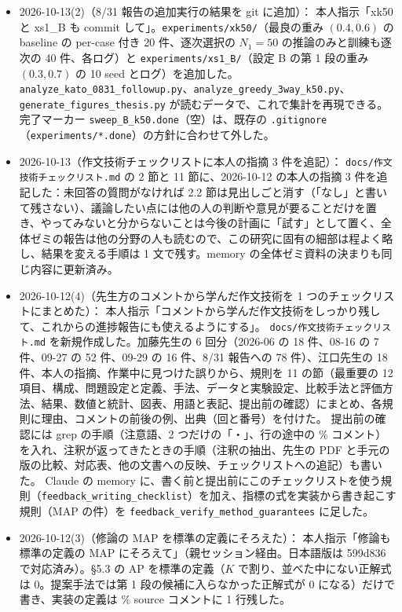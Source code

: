 \documentclass[11pt,a4paper]{jsarticle}
\begin{document}
\begin{itemize}[nosep]
  \item 2026-10-13(2)（8/31 報告の追加実行の結果を git に追加）：
    本人指示「xk50 と xs1\_B も commit して」。\texttt{experiments/xk50/}（最良の重み $(0.4, 0.6)$ の baseline の per-case 付き 20 件、逐次選択の $N_1 = 50$ の推論のみと訓練も逐次の 40 件、各ログ）と \texttt{experiments/xs1\_B/}（設定 B の第 1 段の重み $(0.3, 0.7)$ の 10 seed とログ）を追加した。\texttt{analyze\_kato\_0831\_followup.py}、\texttt{analyze\_greedy\_3way\_k50.py}、\texttt{generate\_figures\_thesis.py} が読むデータで、これで集計を再現できる。完了マーカー \texttt{sweep\_B\_k50.done}（空）は、既存の \texttt{.gitignore}（\texttt{experiments/*.done}）の方針に合わせて外した。
  \item 2026-10-13（作文技術チェックリストに本人の指摘 3 件を追記）：
    \texttt{docs/作文技術チェックリスト.md} の 2 節と 11 節に、2026-10-12 の本人の指摘 3 件を追記した：未回答の質問がなければ 2.2 節は見出しごと消す（「なし」と書いて残さない）、議論したい点には他の人の判断や意見が要ることだけを置き、やってみないと分からないことは今後の計画に「試す」として置く、全体ゼミの報告は他の分野の人も読むので、この研究に固有の細部は程よく略し、結果を変える手順は 1 文で残す。memory の全体ゼミ資料の決まりも同じ内容に更新済み。
  \item 2026-10-12(4)（先生方のコメントから学んだ作文技術を 1 つのチェックリストにまとめた）：
    本人指示「コメントから学んだ作文技術をしっかり残して、これからの進捗報告にも使えるようにする」。
    \texttt{docs/作文技術チェックリスト.md} を新規作成した。加藤先生の 6 回分（2026-06 の 18 件、08-16 の 7 件、09-27 の 52 件、09-29 の 16 件、8/31 報告への 78 件）、江口先生の 18 件、本人の指摘、作業中に見つけた誤りから、規則を 11 の節（最重要の 12 項目、構成、問題設定と定義、手法、データと実験設定、比較手法と評価方法、結果、数値と統計、図表、用語と表記、提出前の確認）にまとめ、各規則に理由、コメントの前後の例、出典（回と番号）を付けた。
    提出前の確認には grep の手順（注意語、2 つだけの「・」、行の途中の \% コメント）を入れ、注釈が返ってきたときの手順（注釈の抽出、先生の PDF と手元の版の比較、対応表、他の文書への反映、チェックリストへの追記）も書いた。
    Claude の memory に、書く前と提出前にこのチェックリストを使う規則（\texttt{feedback\_writing\_checklist}）を加え、指標の式を実装から書き起こす規則（MAP の件）を \texttt{feedback\_verify\_method\_guarantees} に足した。
  \item 2026-10-12(3)（修論の MAP を標準の定義にそろえた）：
    本人指示「修論も標準の定義の MAP にそろえて」（親セッション経由。日本語版は 599d836 で対応済み）。\S 5.3 の AP を標準の定義（$K$ で割り、並べた中にない正解式は 0。提案手法では第 1 段の候補に入らなかった正解式が 0 になる）だけで書き、実装の定義は \% source コメントに 1 行残した。

\end{itemize}
\end{document}
